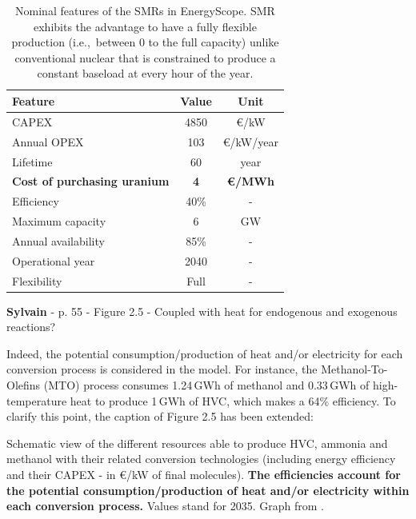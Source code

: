 \documentclass[12pt,a4paper]{article}
\def\ie{i.e.,\ }
\begin{document}
\begin{table}[htbp!]
\caption{Nominal features of the SMRs in EnergyScope. SMR exhibits the advantage to have a fully flexible production (\ie between 0 to the full capacity) unlike conventional nuclear that is constrained to produce a constant baseload at every hour of the year.}
\label{tab:SMR_features}
\begin{minipage}{\linewidth}
\centering
\begin{tabular}{l c c}
\hline
\textbf{Feature} & \textbf{Value} & \textbf{Unit}\\
\hline
CAPEX & 4850 & €/kW \\
Annual OPEX & 103 & €/kW/year \\
Lifetime & 60 & year \\
\textbf{Cost of purchasing uranium} & \textbf{4} & \textbf{€/MWh}\\
Efficiency & 40\% & -\\
Maximum capacity & 6 & GW \\
Annual availability & 85\% & -\\
Operational year & 2040 & - \\
Flexibility & Full & - \\
\hline						

\end{tabular}
\end{minipage}
\end{table}

\begin{mdframed}[style=comment] %
{\color{purple} \textbf{Sylvain}} - p. 55 - Figure 2.5 - Coupled with heat for endogenous and exogenous reactions?
\end{mdframed}

\noindent Indeed, the potential consumption/production of heat and/or electricity for each conversion process is considered in the model. For instance, the Methanol-To-Olefins (MTO) process consumes 1.24\,GWh of methanol and 0.33\,GWh of high-temperature heat to produce 1\,GWh of HVC, which makes a 64\% efficiency. To clarify this point, {\color{blue}the caption of Figure 2.5} has been extended:

\begin{mdframed}[style=manuscript] %
Schematic view of the different resources able to produce HVC, ammonia and methanol with their related conversion technologies (including energy efficiency and their CAPEX - in €/kW of final molecules).  \textbf{The efficiencies account for the potential consumption/production of heat and/or electricity within each conversion process.} Values stand for 2035. Graph from \cite{rixhon2021comprehensive}.
\end{mdframed}
\end{document}
